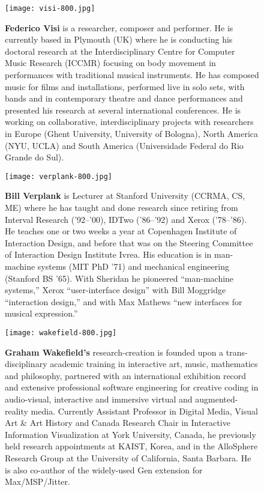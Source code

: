\begin{authbio}
\begin{figure}[H]
  \sidecaption[t]
  \texttt{[image: visi-800.jpg]}
  \caption{\textbf{Federico Visi} is a researcher, composer and performer. He is currently based in Plymouth (UK) where he is conducting his doctoral research at the Interdisciplinary Centre for Computer Music Research (ICCMR) focusing on body movement in performances with traditional musical instruments. He has composed music for films and installations, performed live in solo sets, with bands and in contemporary theatre and dance performances and presented his research at several international conferences. He is working on collaborative, interdisciplinary projects with researchers in Europe (Ghent University, University of Bologna), North America (NYU, UCLA) and South America (Universidade Federal do Rio Grande do Sul).}
\end{figure}


\begin{figure}[H]
  \sidecaption[t]
  \texttt{[image: verplank-800.jpg]}
  \caption{\textbf{Bill Verplank} is Lecturer at Stanford University (CCRMA, CS, ME) where he has taught and done research since retiring from Interval Research ('92--'00), IDTwo ('86--'92) and Xerox ('78--'86). He teaches one or two weeks a year at Copenhagen Institute of Interaction Design, and before that was on the Steering Committee of Interaction Design Institute Ivrea. His education is in man-machine systems (MIT PhD '71) and mechanical engineering (Stanford BS '65). With Sheridan he pioneered ``man-machine systems,'' Xerox ``user-interface design'' with Bill Moggridge ``interaction design,'' and with Max Mathews ``new interfaces for musical expression.''}
\end{figure}

\begin{figure}[H]
  \sidecaption[t]
  \texttt{[image: wakefield-800.jpg]}
  \caption{\textbf{Graham Wakefield's} research-creation is founded upon a trans-disciplinary academic training in interactive art, music, mathematics and philosophy, partnered with an international exhibition record and extensive professional software engineering for creative coding in audio-visual, interactive and immersive virtual and augmented-reality media. Currently Assistant Professor in Digital Media, Visual Art \& Art History and Canada Research Chair in Interactive Information Visualization at York University, Canada, he previously held research appointments at KAIST, Korea, and in the AlloSphere Research Group at the University of California, Santa Barbara. He is also co-author of the widely-used Gen extension for Max/MSP/Jitter.}
\end{figure}


\end{authbio}
